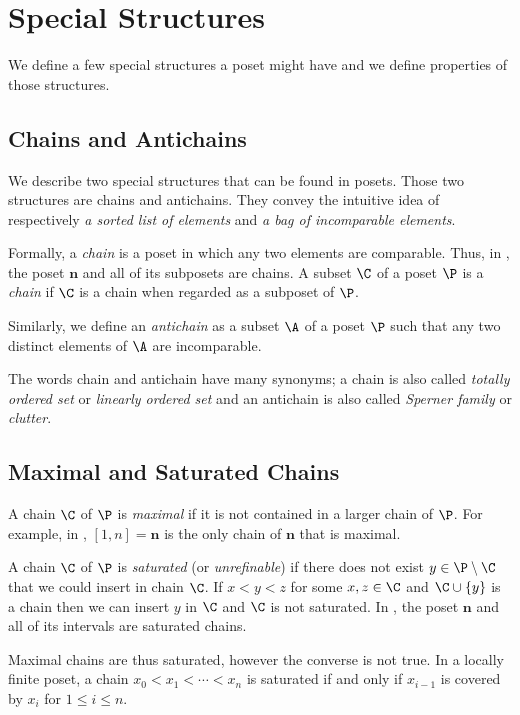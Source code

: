 \section{Special Structures}

We define a few special structures a poset might have and we define properties
of those structures.

\subsection{Chains and Antichains}

We describe two special structures that can be found in
posets. Those two structures are chains and antichains.
They convey the intuitive idea of respectively \emph{a sorted list of
elements} and \emph{a bag of incomparable elements}.

Formally, a \emph{chain} is a poset in which any two elements are
comparable. Thus, in , the poset $\bm{n}$ and all of its
subposets are chains. A subset $\C$ of a poset $\P$ is a \emph{chain} if $\C$ is a
chain when regarded as a subposet of $\P$.

Similarly, we define an \emph{antichain} as a subset $\A$ of a poset $\P$ such
that any two distinct elements of $\A$ are incomparable.

The words chain and antichain have many synonyms; a chain is also called
\emph{totally ordered set} or \emph{linearly ordered set} and an
antichain is also called \emph{Sperner family} or \emph{clutter}.

\subsection{Maximal and Saturated Chains}

A chain \(\C\) of \(\P\) is \emph{maximal} if it is not contained in a larger
chain of $\P$. For example, in , $[1, n] = \bm{n}$ is the
only chain of $\bm{n}$ that is maximal.

A chain $\C$ of $\P$ is \emph{saturated} (or \emph{unrefinable}) if there does not exist
$y \in \P \setminus \C$ that we could insert in chain $\C$. If $x < y < z$ for
some $x, z \in \C$ and $\C \cup \left\{{y}\right\}$ is a chain then we can insert
$y$ in $\C$ and $\C$ is not saturated. In , the poset
$\bm{n}$ and all of its intervals are saturated chains.

Maximal chains are thus saturated, however the converse is not true. In a
locally finite poset, a chain $x_0 < x_1 < \cdots < x_n$ is saturated if and
only if $x_{i-1}$ is covered by $x_i$ for $1 \le i \le n$.



